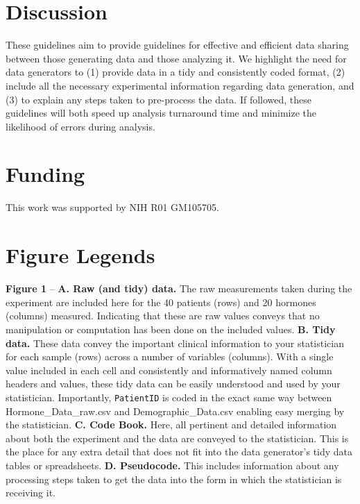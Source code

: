 \documentclass[12pt]{article}
\begin{document}
\section{Discussion}\label{discussion}

These guidelines aim to provide guidelines for effective and efficient
data sharing between those generating data and those analyzing it. We
highlight the need for data generators to (1) provide data in a tidy and
consistently coded format, (2) include all the necessary experimental
information regarding data generation, and (3) to explain any steps
taken to pre-process the data. If followed, these guidelines will both
speed up analysis turnaround time and minimize the likelihood of errors
during analysis.

\section{Funding}\label{funding}

This work was supported by NIH R01 GM105705.

\section{Figure Legends}\label{figure-legends}

\textbf{Figure 1} -- \textbf{A. Raw (and tidy) data.} The raw
measurements taken during the experiment are included here for the 40
patients (rows) and 20 hormones (columns) measured. Indicating that
these are raw values conveys that no manipulation or computation has
been done on the included values. \textbf{B. Tidy data.} These data
convey the important clinical information to your statistician for each
sample (rows) across a number of variables (columns). With a single
value included in each cell and consistently and informatively named
column headers and values, these tidy data can be easily understood and
used by your statistician. Importantly, \texttt{PatientID} is coded in
the exact same way between Hormone\_Data\_raw.csv and
Demographic\_Data.csv enabling easy merging by the statistician.
\textbf{C. Code Book.} Here, all pertinent and detailed information
about both the experiment and the data are conveyed to the statistician.
This is the place for any extra detail that does not fit into the data
generator's tidy data tables or spreadsheets. \textbf{D. Pseudocode.}
This includes information about any processing steps taken to get the
data into the form in which the statistician is receiving it.



\end{document}
